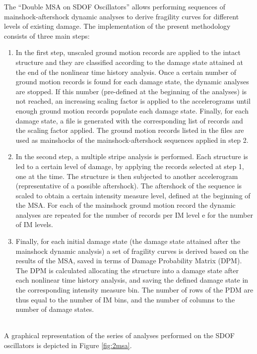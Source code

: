 {The “Double MSA on SDOF Oscillators” allows performing sequences of mainshock-aftershock dynamic analyses to derive fragility curves for different levels of existing damage. The implementation of the present methodology consists of three main steps:

\begin{enumerate}
\item In the first step, unscaled ground motion records are applied to the intact structure and they are classified according to the damage state attained at the end of the nonlinear time history analysis. Once a certain number of ground motion records is found for each damage state, the dynamic analyses are stopped. If this number (pre-defined at the beginning of the analyses) is not reached, an increasing scaling factor is applied to the accelerograms until enough ground motion records populate each damage state. Finally, for each damage state, a file is generated with the corresponding list of records and the scaling factor applied. The ground motion records listed in the files are used as mainshocks of the mainshock-aftershock sequences applied in step 2.

\item In the second step, a multiple stripe analysis is performed. Each structure is led to a certain level of damage, by applying the records selected at step 1, one at the time. The structure is then subjected to another accelerogram (representative of a possible aftershock). The aftershock of the sequence is scaled to obtain a certain intensity measure level, defined at the beginning of the MSA. For each of the mainshock ground motion record the dynamic analyses are repeated for the number of records per IM level e for the number of IM levels.

\item Finally, for each initial damage state (the damage state attained after the mainshock dynamic analysis) a set of fragility curves is derived based on the results of the MSA, saved in terms of Damage Probability Matrix (DPM). The DPM is calculated allocating the structure into a damage state after each nonlinear time history analysis, and saving the defined damage state in the corresponding intensity measure bin. The number of rows of the PDM are thus equal to the number of IM bins, and the number of columns to the number of damage states.
\end{enumerate}
\\
A graphical representation of the series of analyses performed on the SDOF oscillators is depicted in Figure \ref{fig:2msa}.\

}
